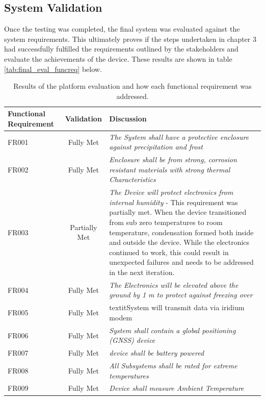 \subsection{System Validation}
Once the testing was completed, the final system was evaluated against the system requirements. This ultimately proves if the steps undertaken in chapter 3 had successfully fulfilled the requirements outlined by the stakeholders and evaluate the achievements of the device. These results are shown in table \ref{tab:final_eval_funcreq} below.

\begin{table}[H]
    \centering
    \caption{Results of the platform evaluation and how each functional requirement was addressed.}
    \begin{tabular}{|m{}|c| m{}|}
    \hline
     Functional Requirement   &  Validation & Discussion\\
     \hline
     FR001 & Fully Met & \textit{The System shall have a protective enclosure against precipitation and frost}\\
          \hline
     FR002 & Fully Met &\textit{Enclosure shall be from strong, corrosion resistant materials with strong thermal Characteristics}\\
          \hline
     FR003 & Partially Met& \textit{The Device will protect electronics from internal humidity} - This requirement was partially met. When the device transitioned from sub zero temperatures to room temperature, condensation formed both inside and outside the device. While the electronics continued to work, this could result in unexpected failures and needs to be addressed in the next iteration.\\
          \hline
     FR004 & Fully Met & \textit{The Electronics will be elevated above the ground by 1 m to protect against freezing over}\\
          \hline
     FR005 &Fully Met & textit{System will transmit data via iridium modem}\\
          \hline
     FR006 &  Fully Met &\textit{System shall contain a global positioning (GNSS) device}\\
          \hline
     FR007 & Fully Met &\textit{device shall be battery powered} \\
          \hline
     FR008 & Fully Met &\textit{All Subsystems shall be rated for extreme temperatures}\\
          \hline
     FR009 & Fully Met& \textit{Device shall measure Ambient Temperature}\\

\end{tabular}
\end{table}

